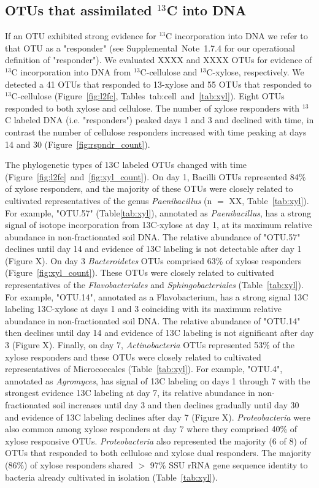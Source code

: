 \subsection{OTUs that assimilated $^{13}$C into DNA} \label{responders}
If an OTU exhibited strong evidence for $^{13}$C incorporation into DNA we
refer to that OTU as a "responder" (see Supplemental Note 1.7.4 for our
operational definition of "responder"). We evaluated XXXX and XXXX OTUs for
evidence of $^{13}$C incorporation into DNA from $^{13}$C-cellulose and
$^{13}$C-xylose, respectively. We detected a 41 OTUs that responded to
13-xylose and 55 OTUs that responded to $^{13}$C-cellulose (Figure~\ref{fig:l2fc}, 
Tables~{tab:cell}~and~\ref{tab:xyl}). Eight OTUs responded to both xylose and cellulose. The number of
xylose responders with $^{13}$C labeled DNA (i.e. "responders") peaked days
1 and 3 and declined with time, in contrast the number of cellulose responders
increased with time peaking at days 14 and 30 (Figure~\ref{fig:rspndr_count}). 

The phylogenetic types of 13C labeled OTUs changed with time (Figure~\ref{fig:l2fc}~and~\ref{fig:xyl_count}).
On day 1, Bacilli OTUs represented 84\% of xylose responders, and the
majority of these OTUs were closely related to cultivated representatives of
the genus \textit{Paenibacillus} (n $=$ XX, Table~\ref{tab:xyl}). For example,
"OTU.57" (Table\ref{tab:xyl}), annotated as \textit{Paenibacillus}, has
a strong signal of isotope incorporation from 13C-xylose at day 1, at its
maximum relative abundance in non-fractionated soil DNA. The relative abundance
of "OTU.57" declines until day 14 and evidence of 13C labeling is not
detectable after day 1 (Figure X). On day 3 \textit{Bacteroidetes} OTUs
comprised 63\% of xylose responders (Figure~\ref{fig:xyl_count}). These OTUs
were closely related to cultivated representatives of the
\textit{Flavobacteriales} and \textit{Sphingobacteriales}
(Table~\ref{tab:xyl}). For example, "OTU.14", annotated as a Flavobacterium,
has a strong signal 13C labeling 13C-xylose at days 1 and 3 coinciding with its
maximum relative abundance in non-fractionated soil DNA. The relative abundance
of "OTU.14" then declines until day 14 and evidence of 13C labeling is not
significant after day 3 (Figure X). Finally, on day 7, \textit{Actinobacteria}
OTUs represented 53\% of the xylose responders and these OTUs were closely
related to cultivated representatives of Micrococcales (Table~\ref{tab:xyl}).
For example, "OTU.4", annotated as \textit{Agromyces}, has signal of 13C
labeling on days 1 through 7 with the strongest evidence 13C labeling at day 7,
its relative abundance in non-fractionated soil increases until day 3 and then
declines gradually until day 30 and evidence of 13C labeling declines after day
7 (Figure X). \textit{Proteobacteria} were also common among xylose responders
at day 7 where they comprised 40\% of xylose responsive OTUs.
\textit{Proteobacteria} also represented the majority (6 of 8) of OTUs that
responded to both cellulose and xylose dual responders. The majority (86\%) of
xylose responders shared $>$ 97\% SSU rRNA gene sequence identity to bacteria
already cultivated in isolation (Table~\ref{tab:xyl}). 

